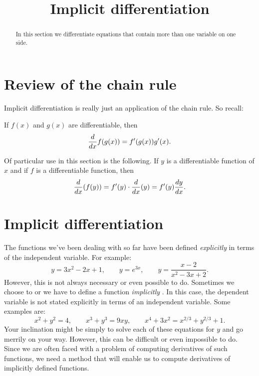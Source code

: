 \documentclass{ximera}
\title[Dig-In:]{Implicit differentiation}
\begin{document}
\begin{abstract}
In this section we differentiate equations that contain more than one variable on one side.
\end{abstract}
\maketitle
\section{Review of the chain rule}

Implicit differentiation is really just an application of the chain rule.
So recall:

\begin{theorem}
If $f(x)$ and $g(x)$ are differentiable, then
\[
\ddx f(g(x)) = f'(g(x))g'(x).
\]
\end{theorem}

Of particular use in this section is the following.  
If $y$ is a differentiable function of $x$ and if $f$ is a differentiable function, then
\[
\ddx (f(y)) = f'(y) \cdot \ddx (y) = f'(y) \dd[y]{x}.
\]


\section{Implicit differentiation}

The functions we've been dealing with so far have been
defined \textit{explicitly}
 in terms of the independent
variable. For example:
\[
y=3x^2-2x+1,\qquad y=e^{3x}, \qquad y = \frac{x-2}{x^2-3x+2}.
\]
However, this is not always  necessary or even possible to do. Sometimes we choose to or we have to define a function  \textit{implicitly
 }. In this case, the dependent variable is not stated
explicitly in terms of an independent variable. Some examples are:
\[
x^2+y^2 = 4,\qquad x^3+y^3 = 9xy, \qquad x^4+3x^2 = x^{2/3}+y^{2/3} + 1.
\]
Your inclination might be simply to solve each of these equations for $y$ and go
merrily on your way. However, this can be difficult or even impossible to do.
Since we are often faced with a problem of computing derivatives of such functions,
we need a  method that will enable us to compute derivatives of implicitly defined functions.
  
\end{document}
